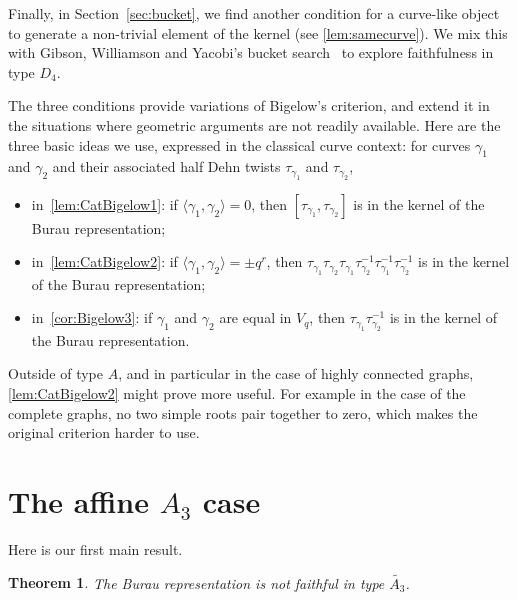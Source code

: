 \documentclass[a4paper]{amsart}
\newcommand{\0}{\mathbf{0}}
\renewcommand{\tilde}{\widetilde}
\theoremstyle{theorem}
\newtheorem{theorem}{Theorem}[section]
\begin{document}
Finally, in Section~\ref{sec:bucket}, we find another condition for a curve-like object to generate a non-trivial element of the kernel (see \cref{lem:samecurve}). We mix this with Gibson, Williamson and Yacobi's bucket search~\cite{GibsonWilliamsonYacobi} to explore faithfulness in type $D_4$.

The three conditions provide variations of Bigelow's criterion, and extend it in the situations where geometric arguments are not readily available. Here are the three basic ideas we use, expressed in the classical curve context: for curves $\gamma_1$ and $\gamma_2$ and their associated half Dehn twists $\tau_{\gamma_1}$ and $\tau_{\gamma_2}$, 
\begin{itemize}
\item in~\cref{lem:CatBigelow1}: if $\langle \gamma_1,\gamma_2\rangle=0$, then $[\tau_{\gamma_1},\tau_{\gamma_2}]$ is in the kernel of the Burau representation;
\item in~\cref{lem:CatBigelow2}: if $\langle \gamma_1,\gamma_2\rangle=\pm q^{r}$, then $\tau_{\gamma_1}\tau_{\gamma_2}\tau_{\gamma_1}\tau_{\gamma_2}^{-1}\tau_{\gamma_1}^{-1}\tau_{\gamma_2}^{-1}$ is in the kernel of the Burau representation;
\item in~\cref{cor:Bigelow3}: if $\gamma_1$ and $\gamma_2$ are equal in $V_q$, then $\tau_{\gamma_1}\tau_{\gamma_2}^{-1}$ is in the kernel of the Burau representation.
\end{itemize}
Outside of type $A$, and in particular in the case of highly connected graphs, \cref{lem:CatBigelow2} might prove more useful.
For example in the case of the complete graphs, no two simple roots pair together to zero, which makes the original criterion harder to use.


\section{The affine \(A_3\) case} \label{sec:A3tilde}

Here is our first main result.

\begin{theorem}\label{thm:unfaithful-affine-a3}
  The Burau representation is not faithful in type $\tilde{A_3}$.
\end{theorem}
\end{document}
